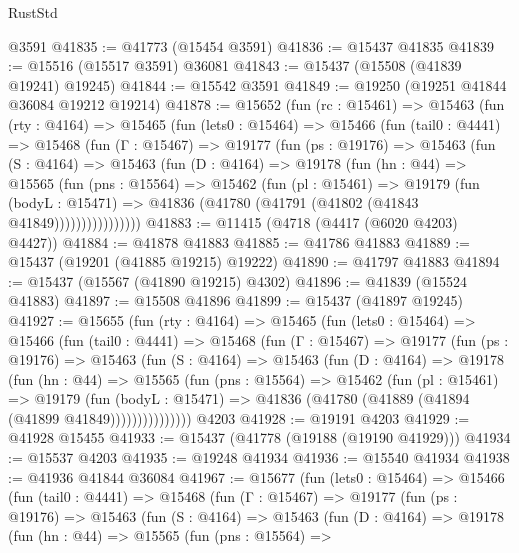 \begin{lexlean}{RustStd}
\begin{coremodule}
    @3591
@41835 := @41773 (@15454 @3591)
@41836 := @15437 @41835
@41839 := @15516 (@15517 @3591) @36081
@41843 := @15437 (@15508 (@41839 @19241) @19245)
@41844 := @15542 @3591
@41849 := @19250 (@19251 @41844 @36084 @19212 @19214)
@41878 := @15652
    (fun (rc : @15461) =>
    @15463
      (fun (rty : @4164) =>
      @15465
        (fun (lets0 : @15464) =>
        @15466
          (fun (tail0 : @4441) =>
          @15468
            (fun (Γ : @15467) =>
            @19177
              (fun (ps : @19176) =>
              @15463
                (fun (S : @4164) =>
                @15463
                  (fun (D : @4164) =>
                  @19178
                    (fun (hn : @44) =>
                    @15565
                      (fun (pns : @15564) =>
                      @15462
                        (fun (pl : @15461) =>
                        @19179
                          (fun (bodyL : @15471) =>
                          @41836 (@41780 (@41791 (@41802 (@41843 @41849))))))))))))))))
@41883 := @11415 (@4718 (@4417 (@6020 @4203) @4427))
@41884 := @41878 @41883
@41885 := @41786 @41883
@41889 := @15437 (@19201 (@41885 @19215) @19222)
@41890 := @41797 @41883
@41894 := @15437 (@15567 (@41890 @19215) @4302)
@41896 := @41839 (@15524 @41883)
@41897 := @15508 @41896
@41899 := @15437 (@41897 @19245)
@41927 := @15655
    (fun (rty : @4164) =>
    @15465
      (fun (lets0 : @15464) =>
      @15466
        (fun (tail0 : @4441) =>
        @15468
          (fun (Γ : @15467) =>
          @19177
            (fun (ps : @19176) =>
            @15463
              (fun (S : @4164) =>
              @15463
                (fun (D : @4164) =>
                @19178
                  (fun (hn : @44) =>
                  @15565
                    (fun (pns : @15564) =>
                    @15462
                      (fun (pl : @15461) =>
                      @19179
                        (fun (bodyL : @15471) =>
                        @41836 (@41780 (@41889 (@41894 (@41899 @41849)))))))))))))))
    @4203
@41928 := @19191 @4203
@41929 := @41928 @15455
@41933 := @15437 (@41778 (@19188 (@19190 @41929)))
@41934 := @15537 @4203
@41935 := @19248 @41934
@41936 := @15540 @41934
@41938 := @41936 @41844 @36084
@41967 := @15677
    (fun (lets0 : @15464) =>
    @15466
      (fun (tail0 : @4441) =>
      @15468
        (fun (Γ : @15467) =>
        @19177
          (fun (ps : @19176) =>
          @15463
            (fun (S : @4164) =>
            @15463
              (fun (D : @4164) =>
              @19178
                (fun (hn : @44) =>
                @15565
                  (fun (pns : @15564) =>

\end{coremodule}
\end{lexlean}
